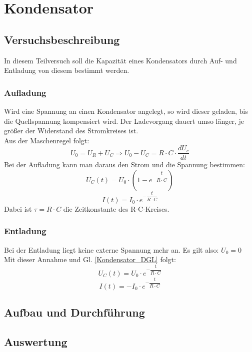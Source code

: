 \documentclass[12pt,a4paper]{article}
\author{Tim}
\begin{document}
\section{Kondensator}
\subsection{Versuchsbeschreibung}
In diesem Teilversuch soll die Kapazität eines Kondensators durch Auf- und Entladung von diesem bestimmt werden.
\subsubsection{Aufladung}
Wird eine Spannung an einen Kondensator angelegt, so wird dieser geladen, bis die Quellspannung kompensiert wird. Der Ladevorgang dauert umso länger, je größer der Widerstand des Stromkreises ist.\\
Aus der Maschenregel folgt:
\begin{equation}
U_0 = U_R + U_C \Rightarrow U_0 - U_C = R\cdot C\cdot \dfrac{dU_c}{dt}
\label{Kondensator_DGL}
\end{equation}
Bei der Aufladung kann man daraus den Strom und die Spannung bestimmen:
\begin{equation}
U_C(t) = U_0 \cdot (1-e^{-\dfrac{t}{R\cdot C}})
\end{equation}
\begin{equation}
I(t) = I_0 \cdot e^{-\dfrac{t}{R\cdot C}}
\end{equation}
Dabei ist $\tau = R \cdot C$ die Zeitkonstante des R-C-Kreises.
\subsubsection{Entladung}
Bei der Entladung liegt keine externe Spannung mehr an. Es gilt also: $U_0 = 0$\\
Mit dieser Annahme und Gl. \ref{Kondensator_DGL} folgt:
\begin{equation}
U_C(t) = U_0 \cdot e^{-\dfrac{t}{R\cdot C}}
\end{equation}
\begin{equation}
I(t) = -I_0 \cdot e^{-\dfrac{t}{R\cdot C}}
\end{equation}
\subsection{Aufbau und Durchführung}

\subsection{Auswertung}
\end{document}

